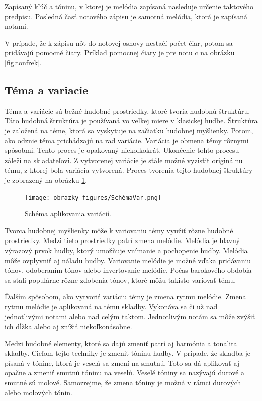 Zapísaný kľúč a tóninu, v ktorej je melódia zapísaná nasleduje určenie taktového predpisu. Posledná časť notového zápisu je samotná melódia, ktorá je zapísaná notami.

V prípade, že k zápisu nôt do notovej osnovy nestačí počet čiar, potom sa pridávajú pomocné čiary. Príklad pomocnej čiary je pre notu c na obrázku \ref{fig:tonfrek}.

\subsection{Téma a variacie}
Téma a variácie sú bežné hudobné prostriedky, ktoré tvoria hudobnú štruktúru. Táto hudobná štruktúra je používaná vo veľkej miere v klasickej hudbe. Štruktúra je založená na téme, ktorá sa vyskytuje na začiatku hudobnej myšlienky. Potom, ako odznie téma prichádzajú na rad variácie. Variácia je obmena témy rôznymi spôsobmi. Tento proces je opakovaný niekoľkokrát. Ukončenie tohto procesu záleží na skladateľovi. Z vytvorenej variácie je stále možné vyzistiť originálnu tému, z ktorej bola variácia vytvorená. Proces tvorenia tejto hudobnej štruktúry je zobrazený na obrázku \ref{fig:Schemvar}.

\begin{figure}[H]
\centering
\texttt{[image: obrazky-figures/SchémaVar.png]}
\caption{Schéma aplikovania variácií.}
\label{fig:Schemvar}
\end{figure}

Tvorca hudobnej myšlienky môže k variovaniu témy využiť rôzne hudobné prostriedky. Medzi tieto prostriedky patrí zmena melódie. Melódia je hlavný výrazový prvok hudby, ktorý umožňuje vnímanie a pochopenie hudby. Melódia môže ovplyvniť aj náladu hudby. Variovanie melódie je možné vďaka pridávaniu tónov, odoberaním tónov alebo invertovanie melódie. Počas barokového obdobia sa stali populárne rôzne zdobenia tónov, ktoré môžu takisto variovať tému.

Ďalším spôsobom, ako vytvoriť variáciu témy je zmena rytmu melódie. Zmena rytmu melódie je aplikovaná na tému skladby. Vykonáva sa či už nad jednotlivými notami alebo nad celým taktom. Jednotlivým notám sa môže zvýšiť ich dĺžka alebo aj znížiť niekoľkonásobne. 

Medzi hudobné elementy, ktoré sa dajú zmeniť patrí aj harmónia a tonalita skladby. Cieľom tejto techniky je zmeniť tóninu hudby. V prípade, že skladba je písaná v tónine, ktorá je veselá sa zmení na smutnú. Toto sa dá aplikovať aj opačne a zmeniť smutnú tóninu na veselú. Veselé tóniny sa nazývajú durové a smutné sú molové. Samozrejme, že zmena tóniny je možná v rámci durových alebo molových tónin.

